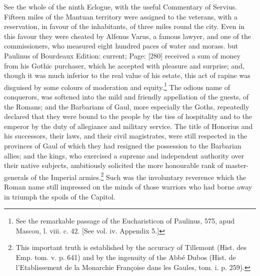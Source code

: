{See the whole of the ninth Eclogue, with the useful Commentary of Servius. Fifteen miles of the Mantuan territory were assigned to the veterans, with a reservation, in favour of the inhabitants, of three miles round the city. Even in this favour they were cheated by Alfenus Varus, a famous lawyer, and one of the commissioners, who measured eight hundred paces of water and morass.} but Paulinus of Bourdeaux Edition: current; Page: [280] received a sum of money from his Gothic purchaser, which he accepted with pleasure and surprise; and, though it was much inferior to the real value of his estate, this act of rapine was disguised by some colours of moderation and equity.\footnote{See the remarkable passage of the Eucharisticon of Paulinus, 575, apud Mascou, l. viii. c. 42. [See vol. iv. Appendix 5.]} The odious name of conquerors, was softened into the mild and friendly appellation of the guests, of the Romans; and the Barbarians of Gaul, more especially the Goths, repeatedly declared that they were bound to the people by the ties of hospitality and to the emperor by the duty of allegiance and military service. The title of Honorius and his successors, their laws, and their civil magistrates, were still respected in the provinces of Gaul of which they had resigned the possession to the Barbarian allies; and the kings, who exercised a supreme and independent authority over their native subjects, ambitiously solicited the more honourable rank of master-generals of the Imperial armies.\footnote{This important truth is established by the accuracy of Tillemont (Hist. des Emp. tom. v. p. 641) and by the ingenuity of the Abbé Dubos (Hist. de l\texthebrew{}’Etablissement de la Monarchie Françoise dans les Gaules, tom. i. p. 259).} Such was the involuntary reverence which the Roman name still impressed on the minds of those warriors who had borne away in triumph the spoils of the Capitol.

